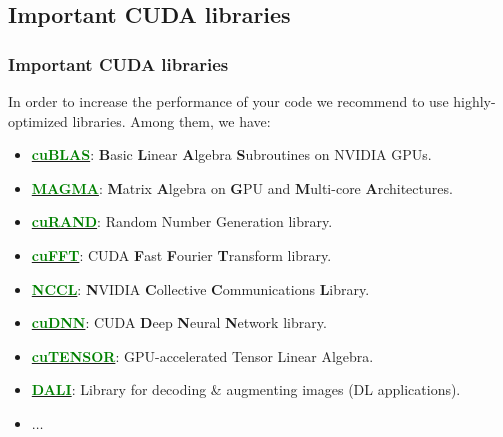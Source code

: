 \subsection{Important CUDA libraries}
\begin{frame}
   \frametitle{Important CUDA libraries}
     In order to increase the performance of your code we recommend 
     to use highly-optimized libraries. Among them, we have:
     \begin{itemize}
	\item \href{https://developer.nvidia.com/cublas}{\textbf{\textcolor{green}{cuBLAS}}}: 
		\textbf{B}asic \textbf{L}inear \textbf{A}lgebra \textbf{S}ubroutines on NVIDIA GPUs.
	\item \href{https://icl.utk.edu/magma/}{\textbf{\textcolor{green}{MAGMA}}}: 
		\textbf{M}atrix \textbf{A}lgebra on \textbf{G}PU and \textbf{M}ulti-core \textbf{A}rchitectures. 		
        \item \href{https://docs.nvidia.com/cuda/pdf/CURAND_Library.pdf}{\textbf{\textcolor{green}{cuRAND}}}: Random Number Generation library.
        \item \href{https://docs.nvidia.com/cuda/pdf/CUFFT_Library.pdf}{\textbf{\textcolor{green}{cuFFT}}}: 
		CUDA \textbf{F}ast \textbf{F}ourier \textbf{T}ransform library.
	\item \href{https://developer.nvidia.com/nccl}{\textbf{\textcolor{green}{NCCL}}}: 
	  \textbf{N}VIDIA \textbf{C}ollective \textbf{C}ommunications \textbf{L}ibrary. 		
	\item \href{https://developer.nvidia.com/cudnn}{\textbf{\textcolor{green}{cuDNN}}}: 
  	  CUDA \textbf{D}eep \textbf{N}eural \textbf{N}etwork library.		
	\item \href{https://developer.nvidia.com/cutensor}{\textbf{\textcolor{green}{cuTENSOR}}}: GPU-accelerated Tensor Linear Algebra.
	\item \href{https://developer.nvidia.com/DALI}{\textbf{\textcolor{green}{DALI}}}: Library for decoding \& augmenting images (DL applications).
        \item $\ldots$
     \end{itemize}
\end{frame}


